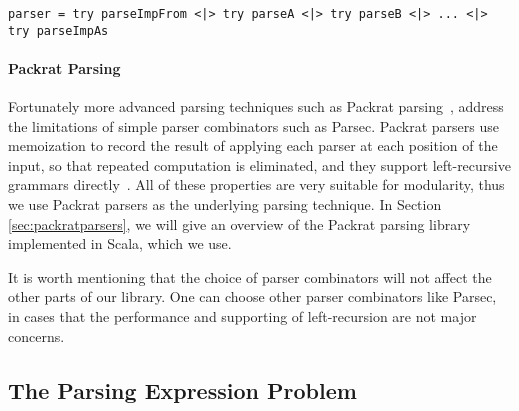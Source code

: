 \begin{lstlisting}[language=PlainCode]
parser = try parseImpFrom <|> try parseA <|> try parseB <|> ... <|> try parseImpAs
\end{lstlisting}


\paragraph{Packrat Parsing}
Fortunately more advanced parsing techniques such as Packrat
parsing~\cite{Ford2002}, address the limitations of simple parser combinators
such as Parsec. Packrat parsers use
memoization to record the result of applying each parser at each
position of the input, so that repeated computation is eliminated, and
they support left-recursive grammars directly~\cite{warth2008}. All of these properties are very
suitable for modularity, thus we use Packrat parsers as the underlying
parsing technique. In Section \ref{sec:packratparsers}, we will give
an overview of the Packrat parsing library implemented in Scala,
which we use.

It is worth mentioning that the choice of parser combinators will not
affect the other parts of our library. One can choose other parser
combinators like Parsec, in cases that the performance and supporting
of left-recursion are not major concerns.

\subsection{The Parsing Expression Problem}\label{subsec:overview-problem}

